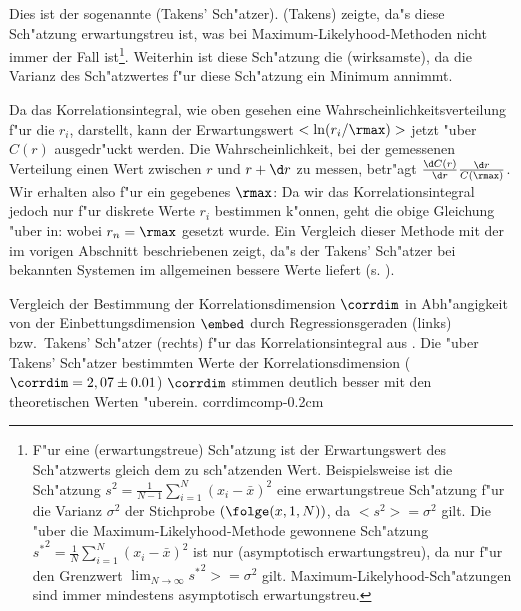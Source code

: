Dies ist der sogenannte \begriff(Takens' Sch"atzer). \autor(Takens) zeigte, da"s
diese Sch"atzung erwartungstreu ist, was bei Maximum-Likelyhood-Methoden
nicht immer der Fall ist\footnote{F"ur eine \begriff(erwartungstreue) Sch"atzung ist
  der Erwartungswert des Sch"atzwerts gleich dem zu sch"atzenden Wert. Beispielsweise ist
  die Sch"atzung $s^2=\frac1{N-1}\sum_{i=1}^N(x_i-\bar x)^2$ eine erwartungstreue
  Sch"atzung f"ur die Varianz $\sigma^2$ der Stichprobe $(\folge(x,1,N))$, da
  $<s^2>=\sigma^2$ gilt. Die "uber die Maximum-Likelyhood-Methode gewonnene Sch"atzung
  ${s^*}^2=\frac1{N}\sum_{i=1}^N(x_i-\bar x)^2$ ist nur \begriff(asymptotisch
  erwartungstreu), da nur f"ur den Grenzwert $\lim_{N\to\infty}{s^*}^2> = \sigma^2$ gilt.
  Maximum-Likelyhood-Sch"atzungen sind immer mindestens asymptotisch erwartungstreu. }.
Weiterhin ist diese Sch"atzung die \begriff(wirksamste), da die Varianz des
Sch"atzwertes f"ur diese Sch"atzung ein Minimum annimmt. 

Da das Korrelationsintegral, wie oben gesehen eine Wahrscheinlichkeitsverteilung f"ur die
$r_i$, darstellt, kann der Erwartungswert $<\ln (r_i/\rmax)>$ jetzt "uber $C(r)$ ausgedr"uckt
werden. Die Wahrscheinlichkeit, bei der gemessenen Verteilung einen Wert zwischen $r$ und
$r+\d r$ zu messen, betr"agt $\frac{\d  C(r)}{\d r}\frac{\d r}{C(\rmax)}$. Wir erhalten
also f"ur ein gegebenes $\rmax$:
Da wir das Korrelationsintegral jedoch nur f"ur diskrete Werte $r_i$ bestimmen k"onnen,
geht die obige Gleichung "uber in:
wobei $r_n=\rmax$ gesetzt wurde.
Ein Vergleich dieser Methode mit der im vorigen Abschnitt beschriebenen zeigt, da"s der
Takens' Sch"atzer bei bekannten Systemen im allgemeinen bessere Werte liefert (s. ).

 { Vergleich der
  Bestimmung der Korrelationsdimension $\corrdim$ in Abh"angigkeit von der
  Einbettungsdimension $\embed$ durch Regressionsgeraden (links) bzw.\ Takens' Sch"atzer
  (rechts) f"ur das Korrelationsintegral aus . Die "uber Takens'
  Sch"atzer bestimmten Werte der Korrelationsdimension ($\corrdim=2,07\pm0.01$) $\corrdim$
  stimmen deutlich besser mit den theoretischen Werten "uberein.  }  {corrdimcomp}{-0.2cm}

